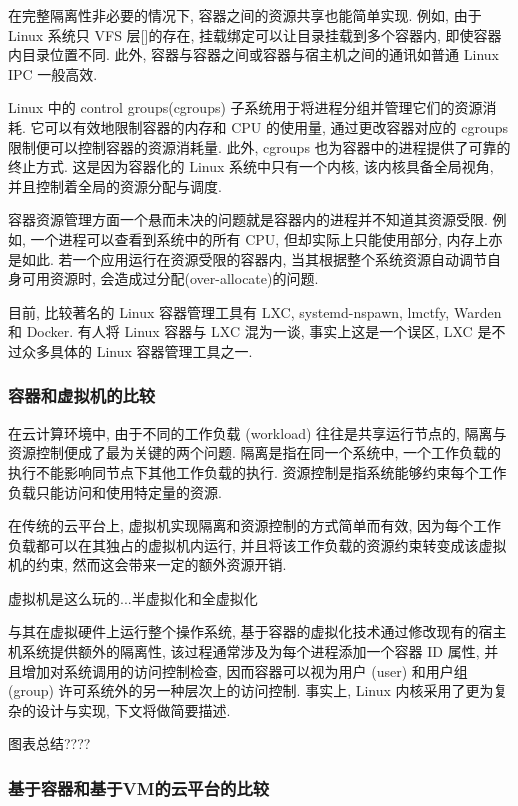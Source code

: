 \documentclass[UTF8,a4paper]{ctexart}
\begin{document}
在完整隔离性非必要的情况下, 容器之间的资源共享也能简单实现. 例如, 由于 Linux 系统只 VFS 层[]的存在, 挂载绑定可以让目录挂载到多个容器内, 即使容器内目录位置不同. 此外, 容器与容器之间或容器与宿主机之间的通讯如普通 Linux IPC 一般高效.

Linux 中的 control groups(cgroups) 子系统用于将进程分组并管理它们的资源消耗. 它可以有效地限制容器的内存和 CPU 的使用量, 通过更改容器对应的 cgroups 限制便可以控制容器的资源消耗量. 此外, cgroups 也为容器中的进程提供了可靠的终止方式. 这是因为容器化的 Linux 系统中只有一个内核, 该内核具备全局视角, 并且控制着全局的资源分配与调度.

容器资源管理方面一个悬而未决的问题就是容器内的进程并不知道其资源受限\cite{Kung2014}. 例如, 一个进程可以查看到系统中的所有 CPU, 但却实际上只能使用部分, 内存上亦是如此. 若一个应用运行在资源受限的容器内, 当其根据整个系统资源自动调节自身可用资源时, 会造成过分配(over-allocate)的问题.

目前, 比较著名的 Linux 容器管理工具有 LXC\cite{LXCweb}, systemd-nspawn\cite{Systemd2012}, lmctfy\cite{lmctfy}, Warden\cite{Warden} 和 Docker\cite{WhatisDocker}. 有人将 Linux 容器与 LXC 混为一谈, 事实上这是一个误区, LXC 是不过众多具体的 Linux 容器管理工具之一.

\subsubsection{容器和虚拟机的比较}
在云计算环境中, 由于不同的工作负载 (workload) 往往是共享运行节点的, 隔离与资源控制便成了最为关键的两个问题. 隔离是指在同一个系统中, 一个工作负载的执行不能影响同节点下其他工作负载的执行. 资源控制是指系统能够约束每个工作负载只能访问和使用特定量的资源.

在传统的云平台上, 虚拟机实现隔离和资源控制的方式简单而有效, 因为每个工作负载都可以在其独占的虚拟机内运行, 并且将该工作负载的资源约束转变成该虚拟机的约束, 然而这会带来一定的额外资源开销.

虚拟机是这么玩的...半虚拟化和全虚拟化

与其在虚拟硬件上运行整个操作系统, 基于容器的虚拟化技术通过修改现有的宿主机系统提供额外的隔离性, 该过程通常涉及为每个进程添加一个容器 ID 属性, 并且增加对系统调用的访问控制检查, 因而容器可以视为用户 (user) 和用户组 (group) 许可系统外的另一种层次上的访问控制. 事实上, Linux 内核采用了更为复杂的设计与实现, 下文将做简要描述.

图表总结????

\subsubsection{基于容器和基于VM的云平台的比较}
\end{document}
